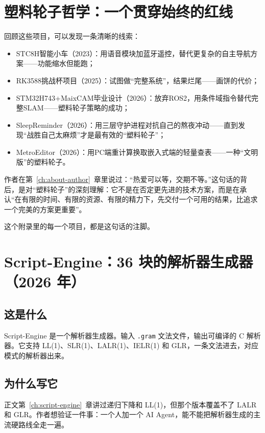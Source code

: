 \section{塑料轮子哲学：一个贯穿始终的红线}

回顾这些项目，可以发现一条清晰的线索：

\begin{itemize}
	\item STC8H智能小车（2023）：用语音模块加蓝牙遥控，替代更复杂的自主导航方案——功能缩水但能跑；
	\item RK3588挑战杯项目（2025）：试图做“完整系统”，结果烂尾——画饼的代价；
	\item STM32H743+MaixCAM毕业设计（2026）：放弃ROS2，用条件域指令替代完整SLAM——塑料轮子策略的成功；
	\item SleepReminder（2026）：用三层守护进程对抗自己的熬夜冲动——直到发现“战胜自己太麻烦”才是最有效的“塑料轮子”；
	\item MetroEditor（2026）：用PC端重计算换取嵌入式端的轻量查表——一种“文明版”的塑料轮子。
\end{itemize}

作者在第~\ref{ch:about-author}~章里说过：“热爱可以等，交期不等。”这句话的背后，是对“塑料轮子”的深刻理解：它不是在否定更先进的技术方案，而是在承认“在有限的时间、有限的资源、有限的精力下，先交付一个可用的结果，比追求一个完美的方案更重要”。

这个附录里的每一个项目，都是这句话的注脚。

\section{Script-Engine：36 块的解析器生成器（2026 年）}

\subsection{这是什么}

Script-Engine 是一个解析器生成器。输入 \texttt{.gram} 文法文件，输出可编译的 C 解析器。它支持 LL(1)、SLR(1)、LALR(1)、IELR(1) 和 GLR，一条文法进去，对应模式的解析器出来。

\subsection{为什么写它}

正文第~\ref{ch:script-engine}~章讲过递归下降和 LL(1)，但那个版本覆盖不了 LALR 和 GLR。作者想验证一件事：一个人加一个 AI Agent，能不能把解析器生成的主流硬路线全走一遍。

